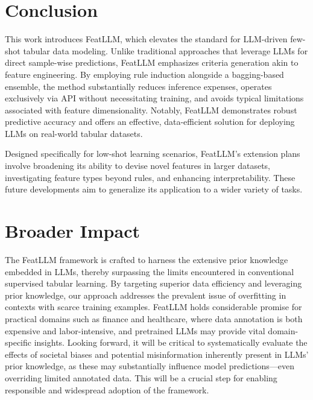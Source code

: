 \section{Conclusion}
This work introduces \textsf{FeatLLM}, which elevates the standard for LLM-driven few-shot tabular data modeling. Unlike traditional approaches that leverage LLMs for direct sample-wise predictions, \textsf{FeatLLM} emphasizes criteria generation akin to feature engineering. By employing rule induction alongside a bagging-based ensemble, the method substantially reduces inference expenses, operates exclusively via API without necessitating training, and avoids typical limitations associated with feature dimensionality. Notably, \textsf{FeatLLM} demonstrates robust predictive accuracy and offers an effective, data-efficient solution for deploying LLMs on real-world tabular datasets.

Designed specifically for low-shot learning scenarios, \textsf{FeatLLM}'s extension plans involve broadening its ability to devise novel features in larger datasets, investigating feature types beyond rules, and enhancing interpretability. These future developments aim to generalize its application to a wider variety of tasks.

\section{Broader Impact}
The \textsf{FeatLLM} framework is crafted to harness the extensive prior knowledge embedded in LLMs, thereby surpassing the limits encountered in conventional supervised tabular learning. By targeting superior data efficiency and leveraging prior knowledge, our approach addresses the prevalent issue of overfitting in contexts with scarce training examples. \textsf{FeatLLM} holds considerable promise for practical domains such as finance and healthcare, where data annotation is both expensive and labor-intensive, and pretrained LLMs may provide vital domain-specific insights. Looking forward, it will be critical to systematically evaluate the effects of societal biases and potential misinformation inherently present in LLMs' prior knowledge, as these may substantially influence model predictions—even overriding limited annotated data. This will be a crucial step for enabling responsible and widespread adoption of the framework.

